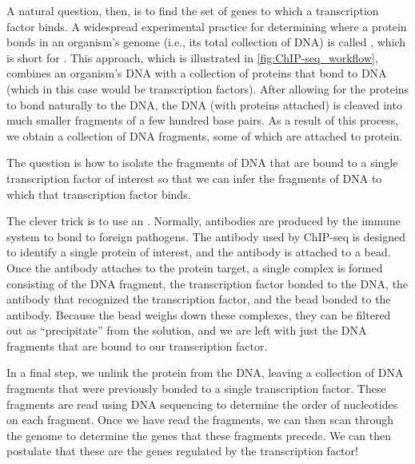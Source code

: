 A natural question, then, is to find the set of genes to which a transcription factor binds. A widespread experimental practice for determining where a protein bonds in an organism's genome (i.e., its total collection of DNA) is called , which is short for . This approach, which is illustrated in \autoref{fig:ChIP-seq_workflow}, combines an organism's DNA with a collection of proteins that bond to DNA (which in this case would be transcription factors). After allowing for the proteins to bond naturally to the DNA, the DNA (with proteins attached) is cleaved into much smaller fragments of a few hundred base pairs. As a result of this process, we obtain a collection of DNA fragments, some of which are attached to protein.

The question is how to isolate the fragments of DNA that are bound to a single transcription factor of interest so that we can infer the fragments of DNA to which that transcription factor binds.

The clever trick is to use an . Normally, antibodies are produced by the immune system to bond to foreign pathogens. The antibody used by ChIP-seq is designed to identify a single protein of interest, and the antibody is attached to a bead. Once the antibody attaches to the protein target, a single complex is formed consisting of the DNA fragment, the transcription factor bonded to the DNA, the antibody that recognized the transcription factor, and the bead bonded to the antibody. Because the bead weighs down these complexes, they can be filtered out as ``precipitate'' from the solution, and we are left with just the DNA fragments that are bound to our transcription factor.

In a final step, we unlink the protein from the DNA, leaving a collection of DNA fragments that were previously bonded to a single transcription factor. These fragments are read using DNA sequencing to determine the order of nucleotides on each fragment. Once we have read the fragments, we can then scan through the genome to determine the genes that these fragments precede. We can then postulate that these are the genes regulated by the transcription factor!\\

